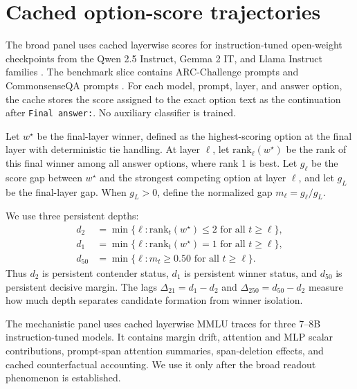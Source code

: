 \section{Cached option-score trajectories}

The broad panel uses cached layerwise scores for \ModelCount{} instruction-tuned open-weight checkpoints from the Qwen 2.5 Instruct, Gemma 2 IT, and Llama Instruct families \citep{qwen25report,gemma2report,llama3herd}. The benchmark slice contains \ArcPromptCount{} ARC-Challenge prompts \citep{clark2018arc} and \CsqaPromptCount{} CommonsenseQA prompts \citep{talmor2019commonsenseqa}. For each model, prompt, layer, and answer option, the cache stores the score assigned to the exact option text as the continuation after \texttt{Final answer:}. No auxiliary classifier is trained.

\begin{table}[t]
\centering
\small

\caption{\textbf{Design summary.} The paper has a broad exact-option trajectory panel and a separate instrumented panel for mechanistic accounting.}
\label{tab:design}
\end{table}

Let $w^\star$ be the final-layer winner, defined as the highest-scoring option at the final layer with deterministic tie handling. At layer $\ell$, let $\mathrm{rank}_\ell(w^\star)$ be the rank of this final winner among all answer options, where rank 1 is best. Let $g_\ell$ be the score gap between $w^\star$ and the strongest competing option at layer $\ell$, and let $g_L$ be the final-layer gap. When $g_L > 0$, define the normalized gap $m_\ell = g_\ell / g_L$.

We use three persistent depths:
\begin{align}
d_2 &= \min \{\ell : \mathrm{rank}_t(w^\star) \le 2 \text{ for all } t \ge \ell\}, \\
d_1 &= \min \{\ell : \mathrm{rank}_t(w^\star) = 1 \text{ for all } t \ge \ell\}, \\
d_{50} &= \min \{\ell : m_t \ge 0.50 \text{ for all } t \ge \ell\}.
\end{align}
Thus $d_2$ is persistent contender status, $d_1$ is persistent winner status, and $d_{50}$ is persistent decisive margin. The lags $\Delta_{21}=d_1-d_2$ and $\Delta_{250}=d_{50}-d_2$ measure how much depth separates candidate formation from winner isolation.

The mechanistic panel uses cached layerwise MMLU traces \citep{hendrycks2021mmlu} for three 7--8B instruction-tuned models. It contains margin drift, attention and MLP scalar contributions, prompt-span attention summaries, span-deletion effects, and cached counterfactual accounting. We use it only after the broad readout phenomenon is established.
